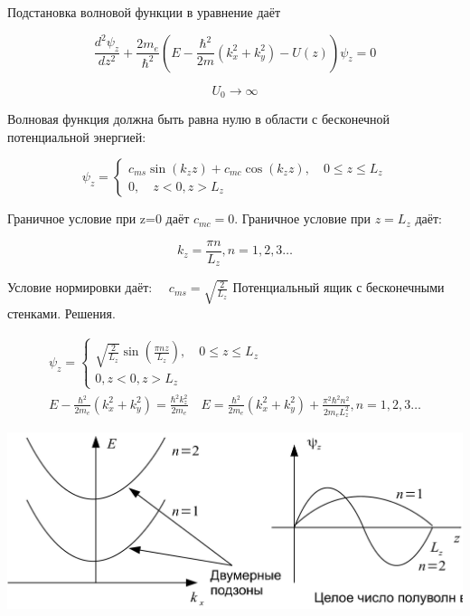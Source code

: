 \documentclass[10pt]{article}
\begin{document}
Подстановка волновой функции в уравнение даёт

$$
\frac{d^{2} \psi_{z}}{d z^{2}}+\frac{2 m_{e}}{\hbar^{2}}\left(E-\frac{\hbar^{2}}{2 m}\left(k_{x}^{2}+k_{y}^{2}\right)-U(z)\right) \psi_{z}=0
$$

$$
U_{0} \rightarrow \infty
$$

Волновая функция должна быть равна нулю в области с бесконечной потенциальной энергией:

$$
\psi_{z}=\left\{\begin{array}{c}
c_{m s} \sin \left(k_{z} z\right)+c_{m c} \cos \left(k_{z} z\right), \quad 0 \leq z \leq L_{z} \\
0, \quad z<0, z>L_{z}
\end{array}\right.
$$

Граничное условие при z=0 даёт $c_{m c}=0$. Граничное условие при $z=L_{z}$ даёт:

$$
k_{z}=\frac{\pi n}{L_{z}}, n=1,2,3 \ldots
$$

Условие нормировки даёт: $\quad c_{m s}=\sqrt{\frac{2}{L_{z}}}$ Потенциальный ящик с бесконечными стенками. Решения.

$$
\begin{gathered}
\psi_{z}=\left\{\begin{array}{c}
\sqrt{\frac{2}{L_{z}}} \sin \left(\frac{\pi n z}{L_{z}}\right), \quad 0 \leq z \leq L_{z} \\
0, z<0, z>L_{z}
\end{array}\right. \\
E-\frac{\hbar^{2}}{2 m_{e}}\left(k_{x}^{2}+k_{y}^{2}\right)=\frac{\hbar^{2} k_{z}^{2}}{2 m_{e}} \quad E=\frac{\hbar^{2}}{2 m_{e}}\left(k_{x}^{2}+k_{y}^{2}\right)+\frac{\pi^{2} \hbar^{2} n^{2}}{2 m_{e} L_{z}^{2}}, n=1,2,3 \ldots
\end{gathered}
$$

\begin{center}
\includegraphics[max width=\textwidth]{2023_05_21_66a3dfca5be088b7d6b7g-05}
\end{center}
\end{document}
